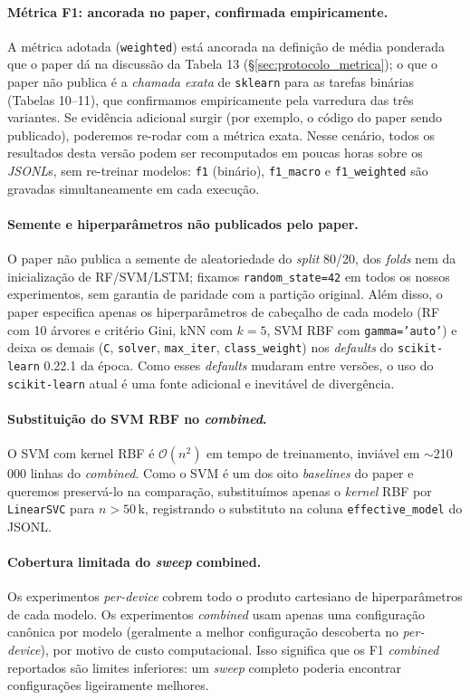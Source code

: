 \paragraph{Métrica F1: ancorada no paper, confirmada empiricamente.}
A métrica adotada (\texttt{weighted}) está ancorada na definição de
média ponderada que o paper dá na discussão da Tabela 13
(\S{}\ref{sec:protocolo_metrica}); o que o paper não publica é a
\emph{chamada exata} de \texttt{sklearn} para as tarefas binárias
(Tabelas 10--11), que confirmamos empiricamente pela varredura das três
variantes. Se evidência adicional surgir (por exemplo, o código do paper
sendo publicado), poderemos re-rodar com a métrica exata. Nesse cenário, todos os
resultados desta versão podem ser recomputados em poucas horas
sobre os \emph{JSONL}s, sem re-treinar modelos: \texttt{f1} (binário),
\texttt{f1\_macro} e \texttt{f1\_weighted} são gravadas
simultaneamente em cada execução.

\paragraph{Semente e hiperparâmetros não publicados pelo paper.}
O paper não publica a semente de aleatoriedade do \emph{split} 80/20,
dos \emph{folds} nem da inicialização de RF/SVM/LSTM; fixamos
\texttt{random\_state=42} em todos os nossos experimentos, sem garantia
de paridade com a partição original. Além disso, o paper especifica
apenas os hiperparâmetros de cabeçalho de cada modelo (RF com 10
árvores e critério Gini, kNN com $k=5$, SVM RBF com
\texttt{gamma='auto'}) e deixa os demais (\texttt{C}, \texttt{solver},
\texttt{max\_iter}, \texttt{class\_weight}) nos \emph{defaults} do
\texttt{scikit-learn} 0.22.1 da época. Como esses \emph{defaults}
mudaram entre versões, o uso do \texttt{scikit-learn} atual é uma
fonte adicional e inevitável de divergência.

\paragraph{Substituição do SVM RBF no \emph{combined}.}
O SVM com kernel RBF é $\mathcal{O}(n^2)$ em tempo de treinamento,
inviável em $\sim$210\,000 linhas do \emph{combined}. Como o SVM é um
dos oito \emph{baselines} do paper e queremos preservá-lo na
comparação, substituímos apenas o \emph{kernel} RBF por
\texttt{LinearSVC} para $n>50$\,k, registrando o substituto na coluna
\texttt{effective\_model} do JSONL.

\paragraph{Cobertura limitada do \emph{sweep} combined.}
Os experimentos \emph{per-device} cobrem todo o produto cartesiano de
hiperparâmetros de cada modelo. Os experimentos \emph{combined}
usam apenas uma configuração canônica por modelo (geralmente a
melhor configuração descoberta no \emph{per-device}), por motivo de
custo computacional. Isso significa que os F1 \emph{combined}
reportados são limites inferiores: um \emph{sweep} completo poderia
encontrar configurações ligeiramente melhores.

